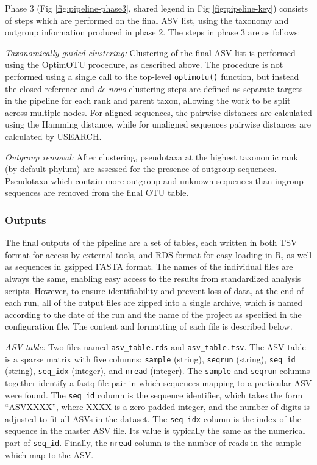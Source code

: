 \documentclass[
]{article}
\begin{document}
Phase 3 (Fig \ref{fig:pipeline-phase3}, shared legend in Fig \ref{fig:pipeline-key}) consists of steps which are performed on the final ASV list, using the taxonomy and outgroup information produced in phase 2.
The steps in phase 3 are as follows:

\emph{Taxonomically guided clustering:}
Clustering of the final ASV list is performed using the OptimOTU procedure, as described above.
The procedure is not performed using a single call to the top-level \texttt{optimotu()} function, but instead the closed reference and \emph{de novo} clustering steps are defined as separate targets in the pipeline for each rank and parent taxon, allowing the work to be split across multiple nodes.
For aligned sequences, the pairwise distances are calculated using the Hamming distance, while for unaligned sequences pairwise distances are calculated by USEARCH.

\emph{Outgroup removal:}
After clustering, pseudotaxa at the highest taxonomic rank (by default phylum) are assessed for the presence of outgroup sequences.
Pseudotaxa which contain more outgroup and unknown sequences than ingroup sequences are removed from the final OTU table.

\subsubsection{Outputs}\label{outputs}

The final outputs of the pipeline are a set of tables, each written in both TSV format for access by external tools, and RDS format for easy loading in R, as well as sequences in gzipped FASTA format.
The names of the individual files are always the same, enabling easy access to the results from standardized analysis scripts.
However, to ensure identifiability and prevent loss of data, at the end of each run, all of the output files are zipped into a single archive, which is named according to the date of the run and the name of the project as specified in the configuration file.
The content and formatting of each file is described below.

\emph{ASV table:} Two files named \texttt{asv\_table.rds} and \texttt{asv\_table.tsv}.
The ASV table is a sparse matrix with five columns: \texttt{sample} (string), \texttt{seqrun} (string), \texttt{seq\_id} (string), \texttt{seq\_idx} (integer), and \texttt{nread} (integer).
The \texttt{sample} and \texttt{seqrun} columns together identify a fastq file pair in which sequences mapping to a particular ASV were found.
The \texttt{seq\_id} column is the sequence identifier, which takes the form ``ASVXXXX'', where XXXX is a zero-padded integer, and the number of digits is adjusted to fit all ASVs in the dataset.
The \texttt{seq\_idx} column is the index of the sequence in the master ASV file.
Its value is typically the same as the numerical part of \texttt{seq\_id}.
Finally, the \texttt{nread} column is the number of reads in the sample which map to the ASV.
\end{document}
